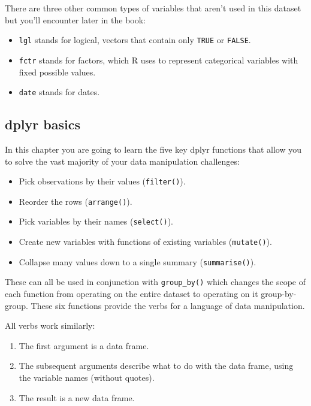 \documentclass[]{book}
\providecommand{\tightlist}{%
  \setlength{\itemsep}{0pt}\setlength{\parskip}{0pt}}
\begin{document}
There are three other common types of variables that aren't used in this
dataset but you'll encounter later in the book:

\begin{itemize}
\item
  \texttt{lgl} stands for logical, vectors that contain only
  \texttt{TRUE} or \texttt{FALSE}.
\item
  \texttt{fctr} stands for factors, which R uses to represent
  categorical variables with fixed possible values.
\item
  \texttt{date} stands for dates.
\end{itemize}

\subsection{dplyr basics}\label{dplyr-basics}

In this chapter you are going to learn the five key dplyr functions that
allow you to solve the vast majority of your data manipulation
challenges:

\begin{itemize}
\tightlist
\item
  Pick observations by their values (\texttt{filter()}).
\item
  Reorder the rows (\texttt{arrange()}).
\item
  Pick variables by their names (\texttt{select()}).
\item
  Create new variables with functions of existing variables
  (\texttt{mutate()}).
\item
  Collapse many values down to a single summary (\texttt{summarise()}).
\end{itemize}

These can all be used in conjunction with \texttt{group\_by()} which
changes the scope of each function from operating on the entire dataset
to operating on it group-by-group. These six functions provide the verbs
for a language of data manipulation.

All verbs work similarly:

\begin{enumerate}
\def\labelenumi{\arabic{enumi}.}
\item
  The first argument is a data frame.
\item
  The subsequent arguments describe what to do with the data frame,
  using the variable names (without quotes).
\item
  The result is a new data frame.
\end{enumerate}
\end{document}
